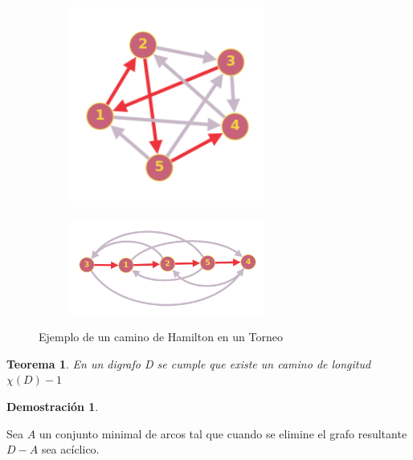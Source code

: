 \documentclass[a4paper,1pt]{report}
\newtheorem*{teo}{Teorema}
\newtheorem*{dem}{Demostración}
\begin{document}
\begin{figure}[H]
    \centering
    \begin{subfigure}[b]{0.30\textwidth}
        \centering
        \includegraphics[width=0.7\textwidth]{figures8/Chamilton.png}
    \end{subfigure} 
        \begin{subfigure}[b]{0.55\textwidth}
        \centering
        \includegraphics[width=0.7\textwidth]{figures8/HamiltonPath.png}
         \end{subfigure} 

        \caption{Ejemplo de un camino de Hamilton en un Torneo}
\end{figure} 

\begin{teo}
 En un digrafo D se cumple que existe un camino de longitud $\chi(D)-1$
\end{teo}

\begin{dem}
 
\end{dem}


Sea $A$ un conjunto minimal de arcos tal que cuando se elimine el grafo resultante $D-A$ sea acíclico.
\end{document}

